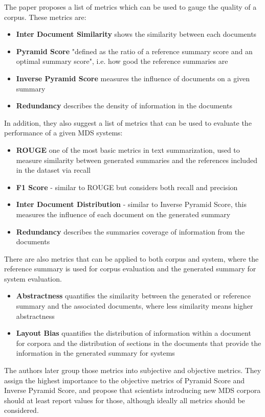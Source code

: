 \documentclass[20_original-paper.tex]{subfiles}
\begin{document}
The paper proposes a list of metrics which can be used to gauge the quality of a corpus. These metrics are:

\begin{itemize}
    \item \textbf{Inter Document Similarity} shows the similarity between each documents
    \item \textbf{Pyramid Score} "defined as the ratio of a reference summary score and an optimal summary score"\cite{dey-etal-2020-corpora},
          i.e. how good the reference summaries are
    \item \textbf{Inverse Pyramid Score} measures the influence of documents on a given summary
    \item \textbf{Redundancy} describes the density of information in the documents
\end{itemize}

In addition, they also suggest a list of metrics that can be used to evaluate the performance of a given MDS systems:

\begin{itemize}
    \item \textbf{ROUGE} one of the most basic metrics in text summarization,
          used to measure similarity between generated summaries and the references included in the dataset via recall \cite{lin-2004-rouge}
    \item \textbf{F1 Score} - similar to ROUGE but considers both recall and precision
    \item \textbf{Inter Document Distribution} - similar to Inverse Pyramid Score, this measures the influence of each document on the generated summary
    \item \textbf{Redundancy} describes the summaries coverage of information from the documents

\end{itemize}

There are also metrics that can be applied to both corpus and system, where the reference summary is used for corpus evaluation and the generated summary for system evaluation.

\begin{itemize}
    \item \textbf{Abstractness} quantifies the similarity between the generated or reference summary and the associated documents, where less similarity means higher abstractness
    \item \textbf{Layout Bias} quantifies the distribution of information within a document for corpora and the distribution of sections in the documents that provide the information in the generated summary for systems
\end{itemize}

The authors later group those metrics into subjective and objective metrics.
They assign the highest importance to the objective metrics of Pyramid Score and Inverse Pyramid Score,
and propose that scientists introducing new MDS corpora should at least report values for those, although ideally all metrics should be considered.
\end{document}
